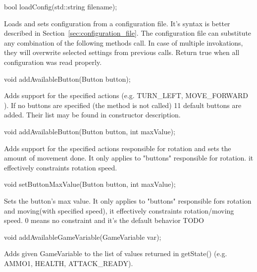 \vspace{20pt}
\begin{clinee}
bool loadConfig(std::string filename);
\end{clinee}

Loads and sets configuration from a configuration file. It's syntax is better described in Section~\ref{sec:configuration_file}. The configuration file can substitute any combination of the following methods call. In case of multiple invokations, they will overwrite selected settings from previous calls. Return true when all configuration was read properly.


\vspace{20pt}
\begin{clinee}
void addAvailableButton(Button button);
\end{clinee}

Adds support for the specified actions (e.g. TURN\_LEFT, MOVE\_FORWARD ). If no buttons are specified (the method is not called) 11 default buttons are added. Their list may be found in constructor description.


\vspace{20pt}
\begin{clinee}
void addAvailableButton(Button button, int maxValue);
\end{clinee}

Adds support for the specified actions responsible for rotation and sets the amount of movement done. It only applies to "buttons" responsible for rotation. it effectively constraints rotation speed. %


\vspace{20pt}
\begin{clinee}
void setButtonMaxValue(Button button, int maxValue);
\end{clinee}

Sets the button's max value. It only applies to "buttons" responsible fors rotation and moving(with specified speed), it effectively constraints rotation/moving speed.
0 means no constraint and it's the default behavior TODO %


\vspace{20pt}
\begin{clinee}
void addAvailableGameVariable(GameVariable var);
\end{clinee}

Adds given GameVariable to the list of values returned in getState() (e.g. AMMO1, HEALTH, ATTACK\_READY).


